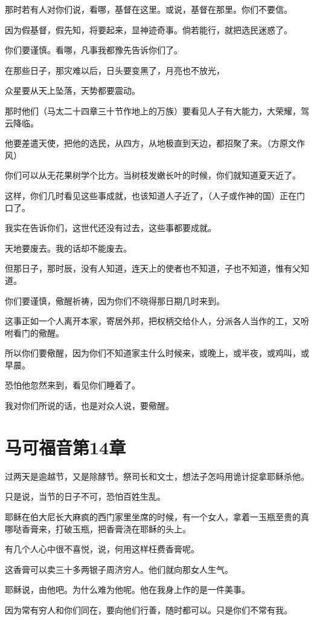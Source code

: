\documentclass[12pt,oneside]{book}
\begin{document}
那时若有人对你们说，看哪，基督在这里。或说，基督在那里。你们不要信。

因为假基督，假先知，将要起来，显神迹奇事。倘若能行，就把选民迷惑了。

你们要谨慎。看哪，凡事我都豫先告诉你们了。

在那些日子，那灾难以后，日头要变黑了，月亮也不放光，

众星要从天上坠落，天势都要震动。

那时他们（马太二十四章三十节作地上的万族）要看见人子有大能力，大荣耀，驾云降临。

他要差遣天使，把他的选民，从四方，从地极直到天边，都招聚了来。（方原文作风）

你们可以从无花果树学个比方。当树枝发嫩长叶的时候，你们就知道夏天近了。

这样，你们几时看见这些事成就，也该知道人子近了，（人子或作神的国）正在门口了。

我实在告诉你们，这世代还没有过去，这些事都要成就。

天地要废去。我的话却不能废去。

但那日子，那时辰，没有人知道，连天上的使者也不知道，子也不知道，惟有父知道。

你们要谨慎，儆醒祈祷，因为你们不晓得那日期几时来到。

这事正如一个人离开本家，寄居外邦，把权柄交给仆人，分派各人当作的工，又吩咐看门的儆醒。

所以你们要儆醒，因为你们不知道家主什么时候来，或晚上，或半夜，或鸡叫，或早晨。

恐怕他忽然来到，看见你们睡着了。

我对你们所说的话，也是对众人说，要儆醒。

\chapter{马可福音第14章}
过两天是逾越节，又是除酵节。祭司长和文士，想法子怎吗用诡计捉拿耶稣杀他。

只是说，当节的日子不可，恐怕百姓生乱。

耶稣在伯大尼长大麻疯的西门家里坐席的时候，有一个女人，拿着一玉瓶至贵的真哪哒香膏来，打破玉瓶，把香膏浇在耶稣的头上。

有几个人心中很不喜悦，说，何用这样枉费香膏呢。

这香膏可以卖三十多两银子周济穷人。他们就向那女人生气。

耶稣说，由他吧。为什么难为他呢。他在我身上作的是一件美事。

因为常有穷人和你们同在，要向他们行善，随时都可以。只是你们不常有我。
\end{document}
